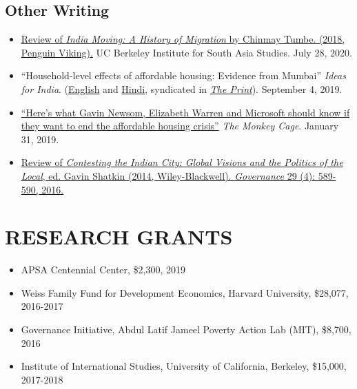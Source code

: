 \documentclass[10pt]{article}
\begin{document}
\subsection*{Other Writing}	
\begin{itemize}
\item[]\href{https://southasia.berkeley.edu/sites/default/files/shared/India_Center/India_Moving.pdf}{Review of \textit{India Moving: A History of Migration} by Chinmay Tumbe. (2018, Penguin Viking).}  UC Berkeley Institute for South Asia Studies. July 28, 2020.
\item[]``Household-level effects of affordable housing: Evidence from Mumbai''  \textit{Ideas for India}. (\href{https://www.ideasforindia.in/topics/poverty-inequality/household-level-effects-of-affordable-housing-evidence-from-mumbai.html}{English} and \href{https://www.ideasforindia.in/topics/poverty-inequality/household-level-effects-of-affordable-housing-evidence-from-mumbai-hindi.html}{Hindi}, syndicated in \href{https://theprint.in/opinion/mumbai-residents-win-govt-housing-lottery-and-spend-more-on-kids-education-jobs-study/290485/}{\textit{The Print}}). September 4, 2019.

\item[]\href{https://www.washingtonpost.com/news/monkey-cage/wp/2019/01/31/heres-what-gavin-newsom-elizabeth-warren-and-microsoft-should-know-if-want-to-end-the-affordable-housing-crisis/?tid=sm_tw_cage}{``Here's what Gavin Newsom, Elizabeth Warren and Microsoft should know if they want to end the affordable housing crisis''} \textit{The Monkey Cage}. January 31, 2019. 
\item[] \href{http://onlinelibrary.wiley.com/doi/10.1111/gove.12241/abstract}{Review of \textit{Contesting the Indian City: Global Visions and the Politics of the Local}, ed. Gavin Shatkin (2014, Wiley-Blackwell). \textit{Governance} 29 (4): 589-590, 2016.} \

\end{itemize}
\vspace{3mm}
\section*{RESEARCH GRANTS}

\begin{itemize}[nosep]
\item[] APSA Centennial Center, \$2,300, 2019

\item[] Weiss Family Fund for Development Economics, Harvard University, \$28,077, 2016-2017
\item[] Governance Initiative, Abdul Latif Jameel Poverty Action Lab (MIT), \$8,700, 2016	
	 
\item[]Institute of International Studies, University of California, Berkeley, \$15,000, 2017-2018
\end{itemize}
\end{document}
